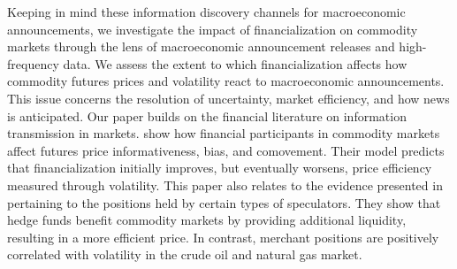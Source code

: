 \documentclass[12pt]{article}
\begin{document}
Keeping in mind these information discovery channels for macroeconomic announcements, we investigate the impact of financialization on commodity markets through the lens of macroeconomic announcement releases and high-frequency data. We assess the extent to which financialization  affects how commodity futures prices and volatility react to macroeconomic announcements. This issue concerns the  resolution of uncertainty, market efficiency, and how news is anticipated. Our paper builds on the financial literature on  information transmission in markets. \citet{goldstein2019commodity} show how financial participants in commodity markets affect futures price informativeness, bias, and comovement. Their model predicts that financialization initially improves, but eventually worsens, price efficiency measured through volatility. This paper also relates to the evidence presented in \citet{brunetti2016speculators} pertaining to the positions held by certain types of speculators. They show that hedge funds benefit commodity markets by providing additional liquidity, resulting in a more efficient price. In contrast, merchant positions are positively correlated with volatility in the crude oil and natural gas market. 

\end{document}
